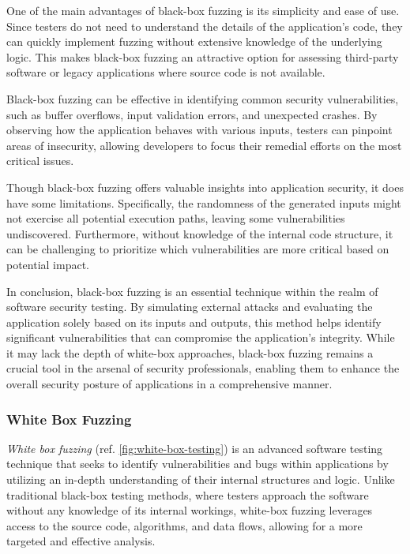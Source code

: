 One of the main advantages of black-box fuzzing is its simplicity and ease of use. Since testers do not need to understand the details of the application’s code, they can quickly implement fuzzing without extensive knowledge of the underlying logic. This makes black-box fuzzing an attractive option for assessing third-party software or legacy applications where source code is not available.

Black-box fuzzing can be effective in identifying common security vulnerabilities, such as buffer overflows, input validation errors, and unexpected crashes. By observing how the application behaves with various inputs, testers can pinpoint areas of insecurity, allowing developers to focus their remedial efforts on the most critical issues.

Though black-box fuzzing offers valuable insights into application security, it does have some limitations. Specifically, the randomness of the generated inputs might not exercise all potential execution paths, leaving some vulnerabilities undiscovered. Furthermore, without knowledge of the internal code structure, it can be challenging to prioritize which vulnerabilities are more critical based on potential impact.

In conclusion, black-box fuzzing is an essential technique within the realm of software security testing. By simulating external attacks and evaluating the application solely based on its inputs and outputs, this method helps identify significant vulnerabilities that can compromise the application’s integrity. While it may lack the depth of white-box approaches, black-box fuzzing remains a crucial tool in the arsenal of security professionals, enabling them to enhance the overall security posture of applications in a comprehensive manner. \cite{godefroid_random_2007}

\subsubsection{White Box Fuzzing}
\label{sec:white-box}
\textit{White box fuzzing} (ref. \autoref{fig:white-box-testing}) is an advanced software testing technique that seeks to identify vulnerabilities and bugs within applications by utilizing an in-depth understanding of their internal structures and logic. Unlike traditional black-box testing methods, where testers approach the software without any knowledge of its internal workings, white-box fuzzing leverages access to the source code, algorithms, and data flows, allowing for a more targeted and effective analysis.

